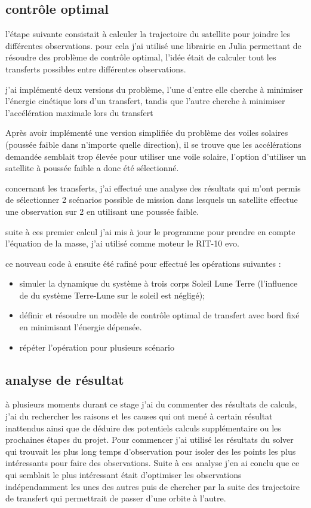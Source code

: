 \documentclass{article} %
\begin{document}
		\subsection{contrôle optimal}
		
		l'étape suivante consistait à calculer la trajectoire du satellite pour joindre les différentes observations.
		pour cela j'ai utilisé une librairie en Julia permettant de résoudre des problème de contrôle optimal, l'idée était de calculer tout les transferts possibles entre différentes observations.
		
		j'ai implémenté deux versions du problème, l'une d'entre elle cherche à minimiser l'énergie cinétique lors d'un transfert, tandis que l'autre cherche à minimiser l'accélération maximale lors du transfert
		
		Après avoir implémenté une version simplifiée du problème des voiles solaires (poussée faible dans n'importe quelle direction), il se trouve que les accélérations demandée semblait trop élevée pour utiliser une voile solaire, l'option d'utiliser un satellite à poussée faible a donc été sélectionné.
		
		concernant les transferts, j'ai effectué une analyse des résultats qui m'ont permis de sélectionner 2 scénarios possible de mission dans lesquels un satellite effectue une observation sur 2 en utilisant une poussée faible.
		
		suite à ces premier calcul j'ai mis à jour le programme pour prendre en compte l'équation de la masse, j'ai utilisé comme moteur le RIT-10 evo.
		
		ce nouveau code à ensuite été rafiné pour effectué les opérations suivantes : 
		
		\begin{itemize}
			\item simuler la dynamique du système à trois corps Soleil Lune Terre (l'influence de du système Terre-Lune sur le soleil est négligé);
			\item définir et résoudre un modèle de contrôle optimal de transfert avec bord fixé en minimisant l'énergie dépensée.
			\item répéter l'opération pour plusieurs scénario 
		\end{itemize}
		
		\subsection{analyse de résultat}
		
		à plusieurs moments durant ce stage j'ai du commenter des résultats de calculs, j'ai du rechercher les raisons et les causes qui ont mené à certain résultat inattendus ainsi que de déduire des potentiels calculs supplémentaire ou les prochaines étapes du projet. Pour commencer j'ai utilisé les résultats du solver qui trouvait les plus long temps d'observation pour isoler des les points les plus intéressants pour faire des observations. Suite à ces analyse j'en ai conclu que ce qui semblait le plus intéressant était d'optimiser les observations indépendamment les unes des autres puis de chercher par la suite des trajectoire de transfert qui permettrait de passer d'une orbite à l'autre.
		
\end{document}
